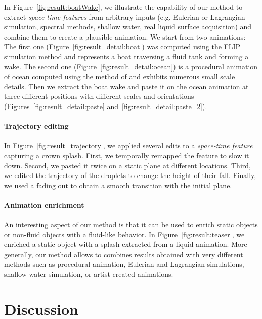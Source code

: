 In Figure~\ref{fig:result:boatWake}, we illustrate the capability of our method to extract \emph{space-time features} from arbitrary inputs (e.g. Eulerian or Lagrangian simulation, spectral methods, shallow water, real liquid surface acquisition) and combine them to create a plausible animation.
We start from two animations: 
The first one (Figure~\ref{fig:result_detail:boat}) 
was computed using the FLIP simulation method \cite{Zhu2005} and represents a boat traversing a fluid tank and forming a wake.
The second one (Figure~\ref{fig:result_detail:ocean}) is a procedural animation of ocean computed using the method of \cite{Tessendorf2004} and exhibits numerous small scale details.
Then we extract the boat wake and paste it on the ocean animation at three different positions with different scales and orientations (Figures~\ref{fig:result_detail:paste} and~\ref{fig:result_detail:paste_2}).

\paragraph{Trajectory editing}

In Figure~\ref{fig:result_trajectory}, we applied several edits to a \emph{space-time feature} capturing a crown splash. First, we temporally remapped the feature to slow it down. 
Second, we pasted it twice on a static plane at different locations. 
Third, we edited the trajectory of the droplets to change the height of their fall. 
Finally, we used a fading out to obtain a smooth transition with the initial plane.

\paragraph{Animation enrichment}

An interesting aspect of our method is that it can be used to enrich static objects or non-fluid objects with a fluid-like behavior. 
In Figure~\ref{fig:result:teaser}, we enriched a static object with a splash extracted from a liquid animation.
More generally, our method allows to combines results obtained with very different methods such as procedural animation, Eulerian and Lagrangian simulations, shallow water simulation, or artist-created animations.

\section{Discussion} \label{sec:fluidsculpting:discussion}

